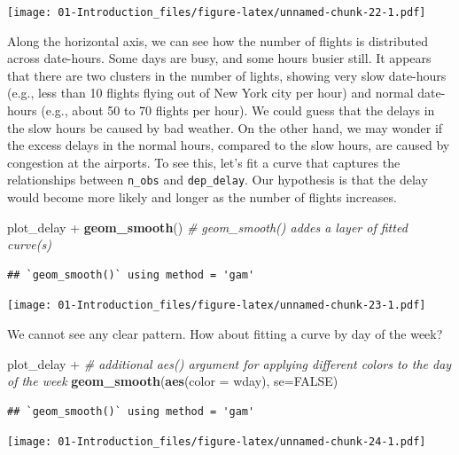 \documentclass[]{book}
\newenvironment{Shaded}{\begin{snugshade}}{\end{snugshade}}
\newcommand{\KeywordTok}[1]{\textcolor[rgb]{0.13,0.29,0.53}{\textbf{{#1}}}}
\newcommand{\DataTypeTok}[1]{\textcolor[rgb]{0.13,0.29,0.53}{{#1}}}
\newcommand{\StringTok}[1]{\textcolor[rgb]{0.31,0.60,0.02}{{#1}}}
\newcommand{\CommentTok}[1]{\textcolor[rgb]{0.56,0.35,0.01}{\textit{{#1}}}}
\newcommand{\OtherTok}[1]{\textcolor[rgb]{0.56,0.35,0.01}{{#1}}}
\newcommand{\NormalTok}[1]{{#1}}
\theoremstyle{definition}
\theoremstyle{definition}
\theoremstyle{remark}
\begin{document}
\texttt{[image: 01-Introduction\_files/figure-latex/unnamed-chunk-22-1.pdf]}

Along the horizontal axis, we can see how the number of flights is
distributed across date-hours. Some days are busy, and some hours busier
still. It appears that there are two clusters in the number of lights,
showing very slow date-hours (e.g., less than 10 flights flying out of
New York city per hour) and normal date-hours (e.g., about 50 to 70
flights per hour). We could guess that the delays in the slow hours be
caused by bad weather. On the other hand, we may wonder if the excess
delays in the normal hours, compared to the slow hours, are caused by
congestion at the airports. To see this, let's fit a curve that captures
the relationships between \texttt{n\_obs} and \texttt{dep\_delay}. Our
hypothesis is that the delay would become more likely and longer as the
number of flights increases.

\begin{Shaded}
\begin{Highlighting}[]
\NormalTok{plot_delay  +}
\StringTok{  }\KeywordTok{geom_smooth}\NormalTok{()   }\CommentTok{#  geom_smooth() addes a layer of fitted curve(s) }
\end{Highlighting}
\end{Shaded}

\begin{verbatim}
## `geom_smooth()` using method = 'gam'
\end{verbatim}

\texttt{[image: 01-Introduction\_files/figure-latex/unnamed-chunk-23-1.pdf]}

We cannot see any clear pattern. How about fitting a curve by day of the
week?

\begin{Shaded}
\begin{Highlighting}[]
\NormalTok{plot_delay  +}
\StringTok{     }\CommentTok{# additional aes() argument for applying different colors to the day of the week}
\StringTok{  }\KeywordTok{geom_smooth}\NormalTok{(}\KeywordTok{aes}\NormalTok{(}\DataTypeTok{color =} \NormalTok{wday), }\DataTypeTok{se=}\OtherTok{FALSE}\NormalTok{) }
\end{Highlighting}
\end{Shaded}

\begin{verbatim}
## `geom_smooth()` using method = 'gam'
\end{verbatim}

\texttt{[image: 01-Introduction\_files/figure-latex/unnamed-chunk-24-1.pdf]}
\end{document}
